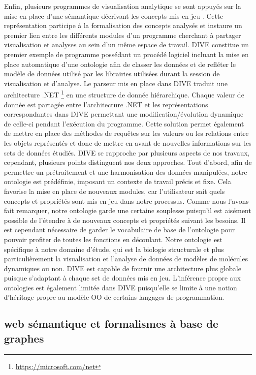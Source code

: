 Enfin, plusieurs programmes de visualisation analytique se sont appuyés sur la mise en place d'une sémantique décrivant les concepts mis en jeu \cite{rysavy_dive:_2014}. Cette représentation participe à la formalisation des concepts analysés et instaure un premier lien entre les différents modules d'un programme cherchant à partager visualisation et analyses au sein d'un même espace de travail. DIVE constitue un premier exemple de programme possédant un procédé logiciel incluant la mise en place automatique d'une ontologie afin de classer les données et de refléter le modèle de données utilisé par les librairies utilisées durant la session de visualisation et d'analyse. Le parseur mis en place dans DIVE traduit une architecture .NET \footnote{\url{https://microsoft.com/net}} en une structure de donnée hiérarchique. Chaque valeur de donnée est partagée entre l'architecture .NET et les représentations correspondantes dans DIVE permettant une modification/évolution dynamique de celle-ci pendant l’exécution du programme. Cette solution permet également de mettre en place des méthodes de requêtes sur les valeurs ou les relations entre les objets représentés et donc de mettre en avant de nouvelles informations sur les sets de données étudiés. DIVE se rapproche par plusieurs aspects de nos travaux, cependant, plusieurs points distinguent nos deux approches. Tout d'abord, afin de permettre un prétraitement et une harmonisation des données manipulées, notre ontologie est prédéfinie, imposant un contexte de travail précis et fixe. Cela favorise la mise en place de nouveaux modules, car l'utilisateur sait quels concepts et propriétés sont mis en jeu dans notre processus. Comme nous l'avons fait remarquer, notre ontologie garde une certaine souplesse puisqu'il est aisément possible de l'étendre à de nouveaux concepts et propriétés suivant les besoins. Il est cependant nécessaire de garder le vocabulaire de base de l'ontologie pour pouvoir profiter de toutes les fonctions en découlant. Notre ontologie est spécifique à notre domaine d'étude, qui est la biologie structurale et plus particulièrement la visualisation et l'analyse de données de modèles de molécules dynamiques ou non. DIVE est capable de fournir une architecture plus globale puisque s'adaptant à chaque set de données mis en jeu. L'inférence propre aux ontologies est également limitée dans DIVE puisqu'elle se limite à une notion d'héritage propre au modèle OO de certains langages de programmation.


\subsection{web sémantique et formalismes à base de graphes}


